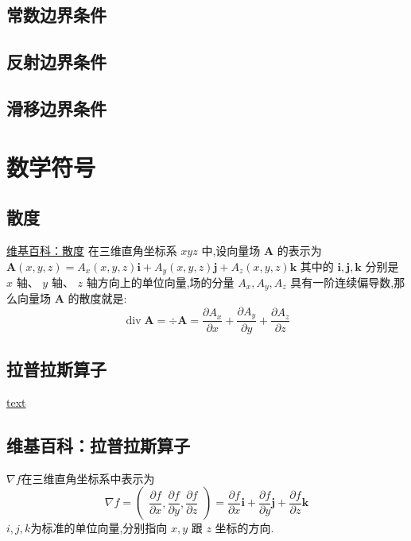 \documentclass{book}
\begin{document}
\subsection{常数边界条件}
\subsection{反射边界条件}
\subsection{滑移边界条件}


\section{数学符号}
\subsection{散度}
\href{https://zh.wikipedia.org/zh-hans/%E6%95%A3%E5%BA%A6}{维基百科：散度} 
在三维直角坐标系  $x y z$  中,设向量场  $\boldsymbol{A}$  的表示为
$\boldsymbol{A}(x, y, z)=A_{x}(x, y, z) \boldsymbol{i}+A_{y}(x, y, z) \boldsymbol{j}+A_{z}(x, y, z) \boldsymbol{k}$ 其中的  $\boldsymbol{i}, \boldsymbol{j}, \boldsymbol{k} $ 分别是  $x$  轴、  $y$  轴、  $z$  轴方向上的单位向量,场的分量  $A_{x}, A_{y}, A_{z}$  具有一阶连续偏导数,那么向量场  $\boldsymbol{A}$  的散度就是:
\begin{equation}
    \operatorname{div} \boldsymbol{A}=\div \boldsymbol{A}=\dfrac{\partial A_{x}}{\partial x}+\dfrac{\partial A_{y}}{\partial y}+\dfrac{\partial A_{z}}{\partial z}
\end{equation}
\subsection{拉普拉斯算子}
\href{https://zh.wikipedia.org/zh-hans/%E6%8B%89%E6%99%AE%E6%8B%89%E6%96%AF%E7%AE%97%E5%AD%90}{text}
\subsection{维基百科：拉普拉斯算子}
$\nabla f$在三维直角坐标系中表示为
\begin{equation}
    {\displaystyle \nabla f={\begin{pmatrix}{\dfrac {\partial f}{\partial x}},{\dfrac {\partial f}{\partial y}},{\dfrac {\partial f}{\partial z}}\end{pmatrix}}={\dfrac {\partial f}{\partial x}}\mathbf {i} +{\dfrac {\partial f}{\partial y}}\mathbf {j} +{\dfrac {\partial f}{\partial z}}\mathbf {k} }
\end{equation}
$i, j, k $为标准的单位向量,分别指向 $x, y$ 跟 $z$ 坐标的方向.
\end{document}
